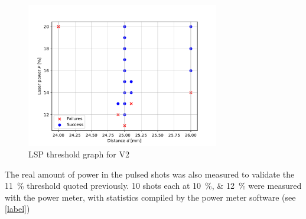             \begin{figure}
                \centering
                \includegraphics[width=0.75\textwidth]{assets/4 experiments/V2_focus_threshold.pdf}
                \caption{LSP threshold graph for V2}
            \end{figure}

            The real amount of power in the pulsed shots was also measured to validate the \qty{11}{\%} threshold quoted previously. 10 shots each at \qtylist{10; 12}{\%} were measured with the power meter, with statistics compiled by the power meter software (see \autoref{label})

